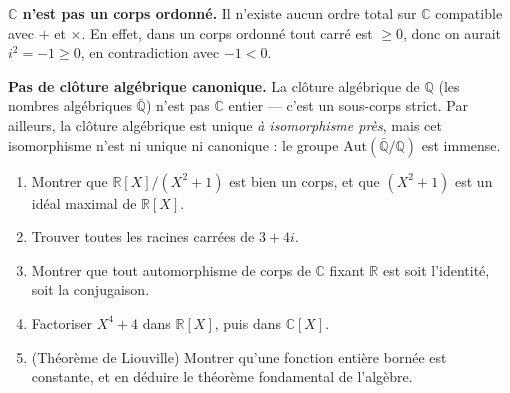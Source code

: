 \vspace{6pt}

\begin{mdframed}[style=cexbar]
  \textbf{$\mathbb{C}$ n'est pas un corps ordonné.}\enspace%
  Il n'existe aucun ordre total sur $\mathbb{C}$ compatible avec $+$ et $\times$.
  En effet, dans un corps ordonné tout carré est $\geq 0$, donc on aurait
  $i^2 = -1 \geq 0$, en contradiction avec $-1 < 0$.

  \smallskip\noindent
  \textbf{Pas de clôture algébrique canonique.}\enspace%
  La clôture algébrique de $\mathbb{Q}$ (les nombres algébriques $\bar{\mathbb{Q}}$)
  n'est pas $\mathbb{C}$ entier — c'est un sous-corps strict. Par ailleurs, la
  clôture algébrique est unique \emph{à isomorphisme près}, mais cet isomorphisme
  n'est ni unique ni canonique : le groupe $\mathrm{Aut}(\bar{\mathbb{Q}}/\mathbb{Q})$
  est immense.
\end{mdframed}

\vspace{6pt}
\exolabel

\begin{mdframed}[style=exobar]
  \begin{enumerate}
    \item Montrer que $\mathbb{R}[X]/(X^2+1)$ est bien un corps, et que
          $(X^2+1)$ est un idéal maximal de $\mathbb{R}[X]$.

    \item Trouver toutes les racines carrées de $3 + 4i$.

    \item Montrer que tout automorphisme de corps de $\mathbb{C}$
          fixant $\mathbb{R}$ est soit l'identité, soit la conjugaison.

    \item Factoriser $X^4 + 4$ dans $\mathbb{R}[X]$, puis dans $\mathbb{C}[X]$.

    \item (Théorème de Liouville) Montrer qu'une fonction entière bornée
          est constante, et en déduire le théorème fondamental de l'algèbre.
  \end{enumerate}
\end{mdframed}

